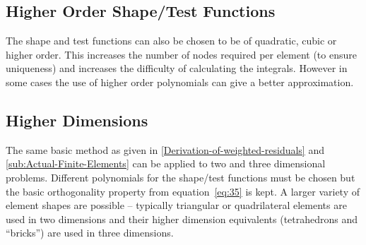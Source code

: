 \subsection{Higher Order Shape/Test Functions}
\label{sec:fem-high-order-shap}

The shape and test functions can also be chosen to be of quadratic, cubic or higher order. This increases the number of nodes required per element (to ensure uniqueness) and increases the difficulty of calculating the integrals. However in some cases the use of higher order polynomials can give a better approximation.


\subsection{Higher Dimensions}
\label{sec:fem-higher-dimensions}

The same basic method as given in \autoref{Derivation-of-weighted-residuals} and \autoref{sub:Actual-Finite-Elements} can be applied to two and three dimensional problems. Different polynomials for the shape/test functions must be chosen but the basic orthogonality property from equation~\eqref{eq:35} is kept. A larger variety of element shapes are possible -- typically triangular or quadrilateral elements are used in two dimensions and their higher dimension equivalents (tetrahedrons and ``bricks'') are used in three dimensions.


